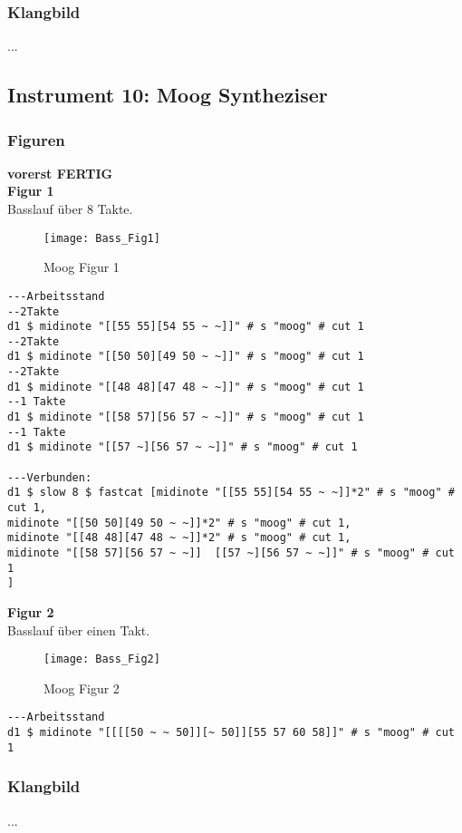 \documentclass[
10pt, %
a4paper, %
oneside, %
headinclude,footinclude, %
BCOR5mm, %
]{scrartcl}
\begin{document}
\subsubsection{Klangbild}
...


\subsection{Instrument 10: Moog Syntheziser}
\subsubsection{Figuren}
{\color{green}\textbf{vorerst FERTIG}} \\

\noindent\textbf{Figur 1}\\
Basslauf über 8 Takte.\\
\begin{figure}[h]
	\centering 
	\texttt{[image: Bass\_Fig1]} 
	\caption{Moog Figur 1}
\end{figure}

\begin{lstlisting}
---Arbeitsstand
--2Takte
d1 $ midinote "[[55 55][54 55 ~ ~]]" # s "moog" # cut 1
--2Takte
d1 $ midinote "[[50 50][49 50 ~ ~]]" # s "moog" # cut 1
--2Takte
d1 $ midinote "[[48 48][47 48 ~ ~]]" # s "moog" # cut 1
--1 Takte
d1 $ midinote "[[58 57][56 57 ~ ~]]" # s "moog" # cut 1
--1 Takte
d1 $ midinote "[[57 ~][56 57 ~ ~]]" # s "moog" # cut 1

---Verbunden:
d1 $ slow 8 $ fastcat [midinote "[[55 55][54 55 ~ ~]]*2" # s "moog" # cut 1,
midinote "[[50 50][49 50 ~ ~]]*2" # s "moog" # cut 1,
midinote "[[48 48][47 48 ~ ~]]*2" # s "moog" # cut 1,
midinote "[[58 57][56 57 ~ ~]]  [[57 ~][56 57 ~ ~]]" # s "moog" # cut 1
]
\end{lstlisting}

\noindent\textbf{Figur 2}\\
Basslauf über einen Takt.
\begin{figure}[h]
	\centering 
	\texttt{[image: Bass\_Fig2]} 
	\caption{Moog Figur 2}
\end{figure}

\begin{lstlisting}
---Arbeitsstand
d1 $ midinote "[[[[50 ~ ~ 50]][~ 50]][55 57 60 58]]" # s "moog" # cut 1
\end{lstlisting}



\subsubsection{Klangbild}
...
\end{document}
